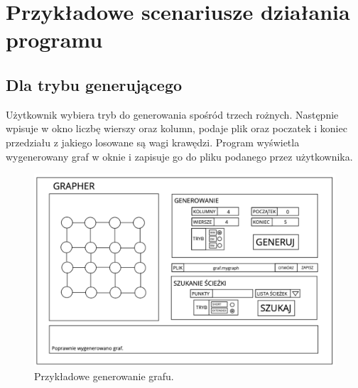 \documentclass[10pt, a4paper]{report}
\begin{document}
    \section{Przykładowe scenariusze działania programu}
    \subsection{Dla trybu generującego}
    Użytkownik wybiera tryb do generowania spośród trzech rożnych. Następnie wpisuje w okno liczbę wierszy oraz kolumn, podaje plik oraz poczatek i koniec przedziału z jakiego losowane są wagi
    krawędzi. Program wyświetla wygenerowany graf w oknie i zapisuje go do pliku podanego przez użytkownika.
  
    \begin{figure}[ht]
      \begin{center}
          \includegraphics[scale=0.22]{example_gen.jpg}
          \caption{Przykładowe generowanie grafu.}
      \end{center}
    \end{figure}
    \newpage
\end{document}
